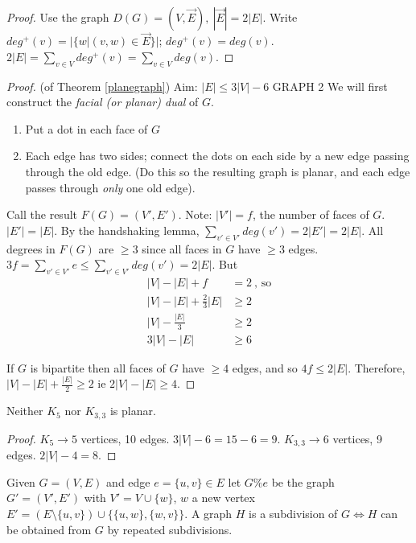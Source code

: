 \documentclass{article}
\begin{document}
\begin{proof}
Use the graph $D(G)= (V, \overrightarrow{E}), ~ |\overrightarrow{E}|=2|E|$.  Write $deg^+(v) = | \{ w| (v,w) \in \overrightarrow{E} \}|$; $deg^+(v) = deg(v)$. $2|E| = \displaystyle \sum_{v \in V} deg^+(v)= \sum_{v \in V} deg(v)$.
\end{proof}

\begin{proof}
(of Theorem \ref{planegraph}) Aim: $|E| \leq 3 |V| -6$ GRAPH 2  We will first construct the \emph{facial (or planar) dual} of $G$.
\begin{enumerate}
 \item Put a dot in each face of $G$
\item Each edge has two sides;  connect the dots on each side by a new edge passing through the old edge. (Do this so the resulting graph is planar, and each edge passes through \emph{only} one old edge).
\end{enumerate}
Call the result $F(G)=(V', E')$. Note: $|V'|=f$, the number of faces of $G$.  $|E'|=|E|$.  By the handshaking lemma, $\displaystyle \sum_{v' \in V'} deg(v') = 2|E'| = 2|E|$.  All degrees in $F(G)$ are $\geq 3$ since all faces in $G$ have $\geq 3$ edges.  $3 f= \displaystyle \sum_{v' \in V'}e \leq \sum_{v' \in V'} deg(v') = 2|E|$. But 
\begin{align*}
|V| - |E| + f &= 2 ~\text{, so} \\
|V|-|E| + \frac{2}{3} |E| &\geq 2 \\
|V| - \frac{|E|}{3} &\geq 2 \\
 3|V| -|E| &\geq 6
\end{align*}

If $G$ is bipartite then all faces of $G$ have $\geq 4$ edges, and so $4 f \leq 2 |E|$.  Therefore, $|V| - |E| + \frac{|E|}{2} \geq 2$ ie $2|V| - |E| \geq 4$.
\end{proof}

\begin{cor}
Neither $K_5$ nor $K_{3,3}$ is planar.
\end{cor}

\begin{proof}
$K_5 \rightarrow 5$ vertices, 10 edges.  $  3|V| - 6 = 15-6 = 9$.
$K_{3,3} \rightarrow 6$ vertices, 9 edges.  $2|V| - 4 = 8$.
\end{proof}

\begin{defn}
Given $G=(V,E)$ and edge $e = \{u,v\} \in E$ let $G\%e$ be the graph $G' = (V',E')$ with $V'= V \cup \{w\}$, $w$ a new vertex $E'=(E \setminus \{u,v\}) \cup \{ \{u,w\}, \{w,v\}\}$.  A graph $H$ is a subdivision of $G \iff H$ can be obtained from $G$ by repeated subdivisions.
\end{defn}
\end{document}
